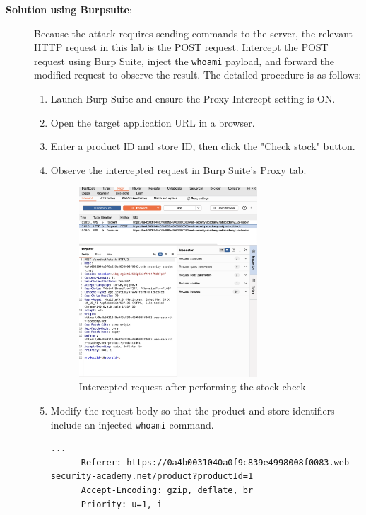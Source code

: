 \documentclass{article}
\begin{document}
\begin{description}
    \item[\textbf{Solution using Burpsuite}:] \leavevmode\par
    Because the attack requires sending commands to the server, the relevant HTTP request in this lab is the POST request. Intercept the POST request using Burp Suite, inject the \texttt{whoami} payload, and forward the modified request to observe the result. The detailed procedure is as follows:
    \begin{enumerate}
      \item Launch Burp Suite and ensure the Proxy Intercept setting is ON.
      \item Open the target application URL in a browser.
      \item Enter a product ID and store ID, then click the "Check stock" button.
      \item Observe the intercepted request in Burp Suite's Proxy tab.
      
      \begin{figure}[htbp]
      \centering
      \includegraphics[width=0.7\textwidth]{../figure/figure1.png}
      \caption{Intercepted request after performing the stock check}
      \label{fig:stock-checker}
      \end{figure}

      \item Modify the request body so that the product and store identifiers include an injected \texttt{whoami} command.
      
      \begin{lstlisting}[label={lst:original-request},caption={Original request}]
      ...
      Referer: https://0a4b0031040a0f9c839e4998008f0083.web-security-academy.net/product?productId=1
      Accept-Encoding: gzip, deflate, br
      Priority: u=1, i


\end{lstlisting}
\end{enumerate}
\end{description}
\end{document}
